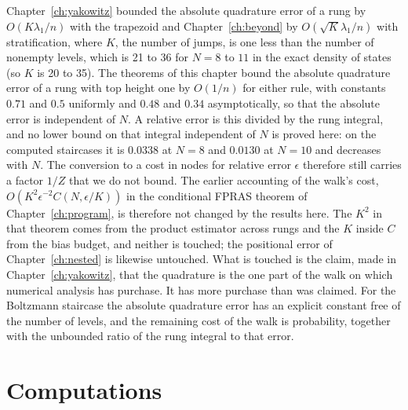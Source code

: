 Chapter~\ref{ch:yakowitz} bounded the absolute quadrature error of a rung by $O(K \lambda_1 / n)$ with the trapezoid and Chapter~\ref{ch:beyond} by $O(\sqrt K \lambda_1 / n)$ with stratification, where $K$, the number of jumps, is one less than the number of nonempty levels, which is 21 to 36 for $N = 8$ to $11$ in the exact density of states (so $K$ is 20 to 35). The theorems of this chapter bound the absolute quadrature error of a rung with top height one by $O(1/n)$ for either rule, with constants $0.71$ and $0.5$ uniformly and $0.48$ and $0.34$ asymptotically, so that the absolute error is independent of $N$. A relative error is this divided by the rung integral, and no lower bound on that integral independent of $N$ is proved here: on the computed staircases it is $0.0338$ at $N = 8$ and $0.0130$ at $N = 10$ and decreases with $N$. The conversion to a cost in nodes for relative error $\epsilon$ therefore still carries a factor $1/Z$ that we do not bound. The earlier accounting of the walk's cost, $O(K^2 \epsilon^{-2} C(N, \epsilon/K))$ in the conditional FPRAS theorem of Chapter~\ref{ch:program}, is therefore not changed by the results here. The $K^2$ in that theorem comes from the product estimator across rungs and the $K$ inside $C$ from the bias budget, and neither is touched; the positional error of Chapter~\ref{ch:nested} is likewise untouched. What is touched is the claim, made in Chapter~\ref{ch:yakowitz}, that the quadrature is the one part of the walk on which numerical analysis has purchase. It has more purchase than was claimed. For the Boltzmann staircase the absolute quadrature error has an explicit constant free of the number of levels, and the remaining cost of the walk is probability, together with the unbounded ratio of the rung integral to that error.

\section{Computations}

